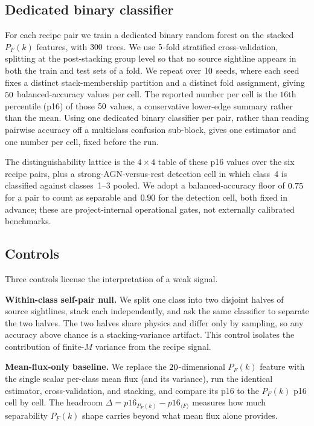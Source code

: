 \subsection{Dedicated binary classifier}
\label{sec:methods:clf}

For each recipe pair we train a dedicated binary random forest
\citep{Breiman2001} on the stacked $P_F(k)$ features, with $300$ trees. We
use $5$-fold stratified cross-validation, splitting at the post-stacking
group level so that no source sightline appears in both the train and test sets
of a fold. We repeat over $10$ seeds, where each seed fixes a distinct
stack-membership partition and a distinct fold assignment, giving
$50$ balanced-accuracy values per cell. The reported number per cell is
the $16$th percentile (p16) of those $50$ values, a conservative
lower-edge summary rather than the mean. Using one dedicated binary classifier
per pair, rather than reading pairwise accuracy off a multiclass confusion
sub-block, gives one estimator and one number per cell, fixed before the run.

The distinguishability lattice is the $4\times4$ table of these p16 values over
the six recipe pairs, plus a strong-AGN-versus-rest detection cell in which
class~4 is classified against classes~1--3 pooled. We adopt a balanced-accuracy
floor of $0.75$ for a pair to count as separable and $0.90$ for the
detection cell, both fixed in advance; these are project-internal operational
gates, not externally calibrated benchmarks.

\subsection{Controls}
\label{sec:methods:controls}

Three controls license the interpretation of a weak signal.

\textbf{Within-class self-pair null.} We split one class into two disjoint halves
of source sightlines, stack each independently, and ask the same classifier to
separate the two halves. The two halves share physics and differ only by
sampling, so any accuracy above chance is a stacking-variance artifact. This
control isolates the contribution of finite-$M$ variance from the recipe signal.

\textbf{Mean-flux-only baseline.} We replace the $20$-dimensional $P_F(k)$
feature with the single scalar per-class mean flux (and its variance), run the
identical estimator, cross-validation, and stacking, and compare its p16 to the
$P_F(k)$ p16 cell by cell. The headroom $\Delta=p16_{P_F(k)}-p16_{\langle
F\rangle}$ measures how much separability $P_F(k)$ shape carries beyond what mean
flux alone provides.

